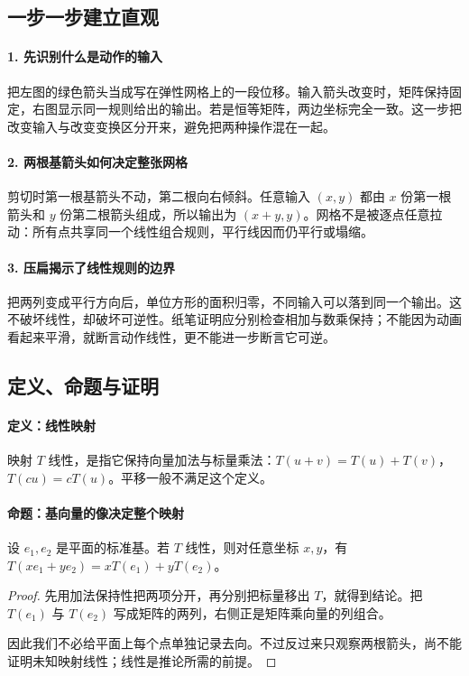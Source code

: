 \subsection*{一步一步建立直观}

\paragraph{1. 先识别什么是动作的输入}

把左图的绿色箭头当成写在弹性网格上的一段位移。输入箭头改变时，矩阵保持固定，右图显示同一规则给出的输出。若是恒等矩阵，两边坐标完全一致。这一步把改变输入与改变变换区分开来，避免把两种操作混在一起。



\paragraph{2. 两根基箭头如何决定整张网格}

剪切时第一根基箭头不动，第二根向右倾斜。任意输入 $(x,y)$ 都由 $x$ 份第一根箭头和 $y$ 份第二根箭头组成，所以输出为 $(x+y,y)$。网格不是被逐点任意拉动：所有点共享同一个线性组合规则，平行线因而仍平行或塌缩。



\paragraph{3. 压扁揭示了线性规则的边界}

把两列变成平行方向后，单位方形的面积归零，不同输入可以落到同一个输出。这不破坏线性，却破坏可逆性。纸笔证明应分别检查相加与数乘保持；不能因为动画看起来平滑，就断言动作线性，更不能进一步断言它可逆。



\subsection*{定义、命题与证明}

\paragraph{定义：线性映射}

映射 $T$ 线性，是指它保持向量加法与标量乘法：$T(u+v)=T(u)+T(v)$，$T(cu)=cT(u)$。平移一般不满足这个定义。

\paragraph{命题：基向量的像决定整个映射}

设 $e_1,e_2$ 是平面的标准基。若 $T$ 线性，则对任意坐标 $x,y$，有 $T(xe_1+ye_2)=xT(e_1)+yT(e_2)$。

\begin{proof}

先用加法保持性把两项分开，再分别把标量移出 $T$，就得到结论。把 $T(e_1)$ 与 $T(e_2)$ 写成矩阵的两列，右侧正是矩阵乘向量的列组合。

因此我们不必给平面上每个点单独记录去向。不过反过来只观察两根箭头，尚不能证明未知映射线性；线性是推论所需的前提。

\end{proof}
